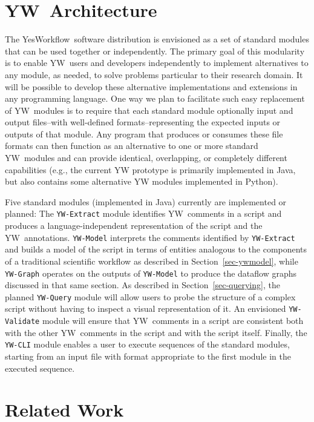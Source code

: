 \documentclass[15]{idcc}
\newcommand{\YW}{\textsf{YesWorkflow}}
\newcommand{\yw}{\textsf{YW}}
\newcommand{\ywt}{YW}
\newcommand{\ywm}[1]{\texttt{\small #1}}
\begin{document}
\section{\ywt\ Architecture}

The \YW\ software distribution is envisioned as a set of standard
modules that can be used together or independently. The primary goal
of this modularity is to enable \yw\ users and developers
independently to implement alternatives to any module, as needed, to
solve problems particular to their research domain. It will be
possible to develop these alternative implementations and extensions
in any programming language.  One way we plan to facilitate such easy
replacement of \yw\ modules is to require that each standard module
optionally input and output files--with well-defined
formats--representing the expected inputs or outputs of that
module. Any program that produces or consumes these file formats can
then function as an alternative to one or more standard \yw\ modules
and can provide identical, overlapping, or completely different
capabilities (e.g., the current \textsf{YW} prototype is primarily
implemented in Java, but also contains some alternative \textsf{YW}
modules implemented in Python).

Five standard modules (implemented in Java) currently are implemented
or planned: The \ywm{YW-Extract} module identifies \yw\ comments in a
script and produces a language-independent representation of the
script and the \yw\ annotations. \ywm{YW-Model} interprets the comments
identified by \ywm{YW-Extract} and builds a model of the script in
terms of entities analogous to the components of a traditional
scientific workflow as described in Section~\ref{sec-ywmodel}, while
\ywm{YW-Graph} operates on the outputs of \ywm{YW-Model} to produce
the dataflow graphs discussed in that same section. As described in
Section~\ref{sec-querying}, the planned \ywm{YW-Query} module will
allow users to probe the structure of a complex script without having
to inspect a visual representation of it. An envisioned
\ywm{YW-Validate} module will ensure that \yw\ comments in a script
are consistent both with the other \yw\ comments in the script and
with the script itself. Finally, the \ywm{YW-CLI} module enables a
user to execute sequences of the standard modules, starting from an
input file with format appropriate to the first module in the executed
sequence.


\section{Related Work}
\end{document}
